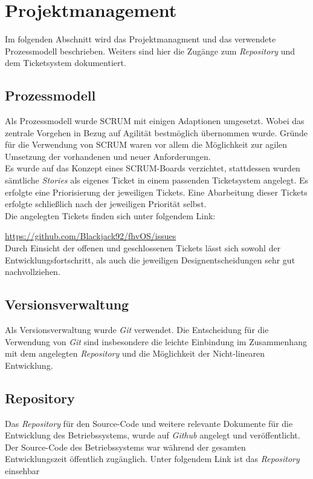 \section{Projektmanagement}
Im folgenden Abschnitt wird das Projektmanagment und das verwendete Prozessmodell beschrieben. Weiters sind hier die Zugänge zum \textit{Repository} und dem Ticketsystem dokumentiert.

\subsection{Prozessmodell}
Als Prozessmodell wurde SCRUM mit einigen Adaptionen umgesetzt. Wobei das zentrale Vorgehen in Bezug auf Agilität bestmöglich übernommen wurde. Gründe für die Verwendung von SCRUM waren vor allem die Möglichkeit zur agilen Umsetzung der vorhandenen und neuer Anforderungen.\\
Es wurde auf das Konzept eines SCRUM-Boards verzichtet, stattdessen wurden sämtliche \textit{Stories} als eigenes Ticket in einem passenden Ticketsystem angelegt. Es erfolgte eine Priorisierung der jeweiligen Tickets. Eine Abarbeitung dieser Tickets erfolgte schließlich nach der jeweiligen Priorität selbst.\\

Die angelegten Tickets finden sich unter folgendem Link:

\url{https://github.com/Blackjack92/fhvOS/issues} \\

Durch Einsicht der offenen und geschlossenen Tickets lässt sich sowohl der Entwicklungsfortschritt, als auch die jeweiligen Designentscheidungen sehr gut nachvollziehen.

\subsection{Versionsverwaltung}
Als Versionsverwaltung wurde \textit{Git} verwendet. Die Entscheidung für die Verwendung von \textit{Git} sind insbesondere die leichte Einbindung im Zusammenhang mit dem angelegten \textit{Repository} und die Möglichkeit der Nicht-linearen Entwicklung.

\subsection{Repository}
\label{Repository}
Das \textit{Repository} für den Source-Code und weitere relevante Dokumente für die Entwicklung des Betriebssystems, wurde auf \textit{Github} angelegt und veröffentlicht. Der Source-Code des Betriebssystems war während der gesamten Entwicklungszeit öffentlich zugänglich. Unter folgendem Link ist das \textit{Repository} einsehbar\\

